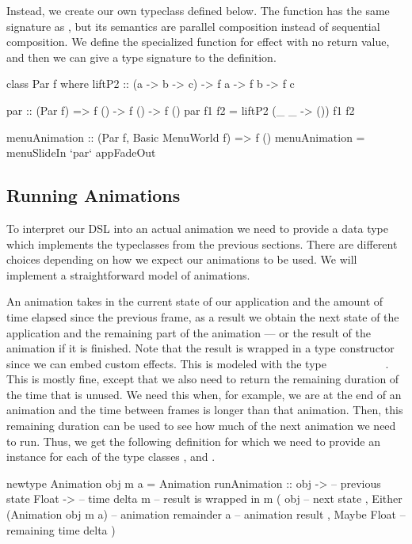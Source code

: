 Instead, we create our own  typeclass defined below. The function  has the same signature as , but its semantics are parallel composition instead of sequential composition. We define the specialized  function for effect with no return value, and then we can give a type signature to the  definition.

\begin{code}
class Par f where
  liftP2 :: (a -> b -> c) -> f a -> f b -> f c

par :: (Par f) => f () -> f () -> f ()
par f1 f2 = liftP2 (\_ _ -> ()) f1 f2

menuAnimation :: (Par f, Basic MenuWorld f) => f ()
menuAnimation = menuSlideIn `par` appFadeOut
\end{code}

\subsection{Running Animations}

To interpret our DSL into an actual animation we need to provide a data type which implements the typeclasses from the previous sections. There are different choices depending on how we expect our animations to be used. We will implement a straightforward model of animations.

An animation takes in the current state of our application and the amount of time elapsed since the previous frame, as a result we obtain the next state of the application and the remaining part of the animation --- or the result of the animation if it is finished. Note that the result is wrapped in a type constructor  since we can embed custom effects. This is modeled with the type ~\hs{->}~~\hs{->}~~~~~~~. This is mostly fine, except that we also need to return the remaining duration of the time that is unused. We need this when, for example, we are at the end of an animation and the time between frames is longer than that animation. Then, this remaining duration can be used to see how much of the next animation we need to run. Thus, we get the following definition for which we need to provide an instance for each of the type classes ,  and .

\begin{code}
newtype Animation obj m a = Animation {
  runAnimation ::
    obj -> -- previous state
    Float -> -- time delta
    m -- result is wrapped in m
      ( obj -- next state
      , Either
          (Animation obj m a) -- animation remainder
          a -- animation result
      , Maybe Float -- remaining time delta
      )
}
\end{code}

